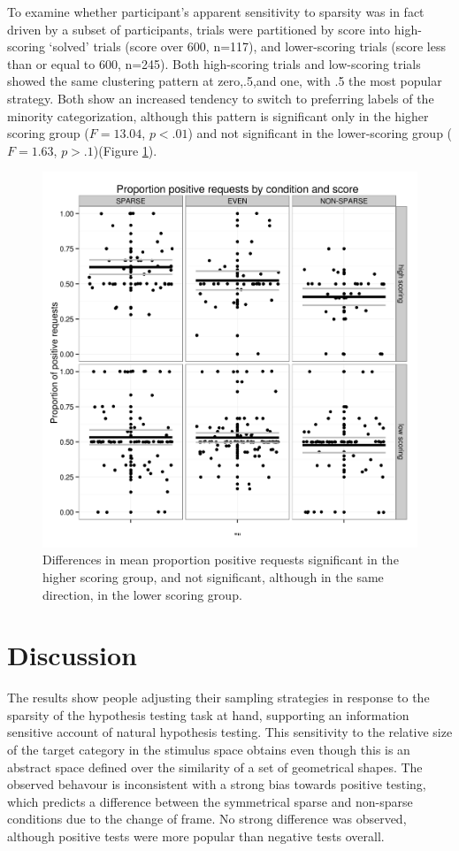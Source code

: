 \documentclass[10pt,letterpaper]{article}
\begin{document}
To examine whether participant's apparent sensitivity to sparsity was in fact driven by a subset of participants, trials were partitioned by score into high-scoring `solved' trials (score over 600, n=117), and lower-scoring trials (score less than or equal to 600, n=245). Both high-scoring trials and low-scoring trials showed the same clustering pattern at zero,.5,and one, with .5 the most popular strategy. Both show an increased tendency to switch to preferring labels of the minority categorization, although this pattern is significant only in the higher scoring group ($F=13.04$, $p<.01$) and not significant in the lower-scoring group ($F=1.63$, $p>.1$)(Figure \ref{dotsbyscore}).

\begin{figure}[t]
\includegraphics[width=.5\textwidth]{dotsbyscore.png}
\caption{Differences in mean proportion positive requests significant in the higher scoring group, and not significant, although in the same direction, in the lower scoring group.}
\label{dotsbyscore}
\end{figure}

\section{Discussion}
The results show people adjusting their sampling strategies in response to the sparsity of the hypothesis testing task at hand, supporting an information sensitive account of natural hypothesis testing\cite{navarro2011sparsecat}. This sensitivity to the relative size of the target category in the stimulus space obtains even though this is an abstract space defined over the similarity of a set of geometrical shapes. The observed behavour is inconsistent with a strong bias towards positive testing, which predicts a difference between the symmetrical {\sc sparse} and {\sc non-sparse} conditions due to the change of frame. No strong difference was observed, although positive tests were more popular than negative tests overall. 
\end{document}
